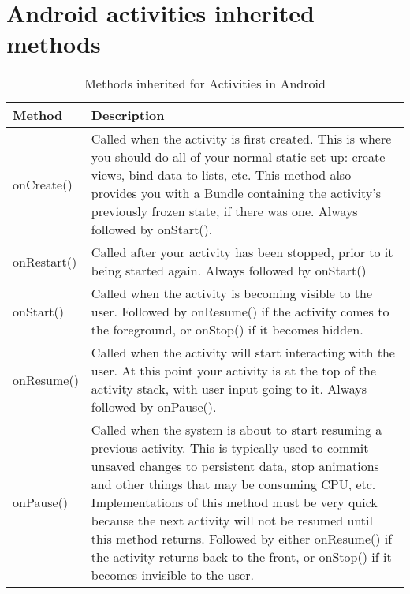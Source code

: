 \newpage
\section{Android activities inherited methods}
\label{appendix:activity methods}

\begin{table}[H]
\centering
\caption{Methods inherited for Activities in Android}
\label{tab:android-activities-method}
\begin{tabular}{|l|p{12cm}|}
\hline
\textbf{Method} & \textbf{Description}  \\ \hline
onCreate()      &   Called when the activity is first created. This is where you should do all of your normal static set up: create views, bind data to lists, etc. This method also provides you with a Bundle containing the activity's previously frozen state, if there was one. Always followed by onStart(). \newline \\ \hline

onRestart()     &   Called after your activity has been stopped, prior to it being started again. Always followed by onStart() \newline \\ \hline

onStart()       &   Called when the activity is becoming visible to the user. Followed by onResume() if the activity comes to the foreground, or onStop() if it becomes hidden. \newline \\ \hline

onResume()      &   Called when the activity will start interacting with the user. At this point your activity is at the top of the activity stack, with user input going to it. Always followed by onPause(). \newline \\ \hline

onPause()       &   Called when the system is about to start resuming a previous activity. This is typically used to commit unsaved changes to persistent data, stop animations and other things that may be consuming CPU, etc. Implementations of this method must be very quick because the next activity will not be resumed until this method returns. Followed by either onResume() if the activity returns back to the front, or onStop() if it becomes invisible to the user. \newline \\ \hline


\end{tabular}
\end{table}
